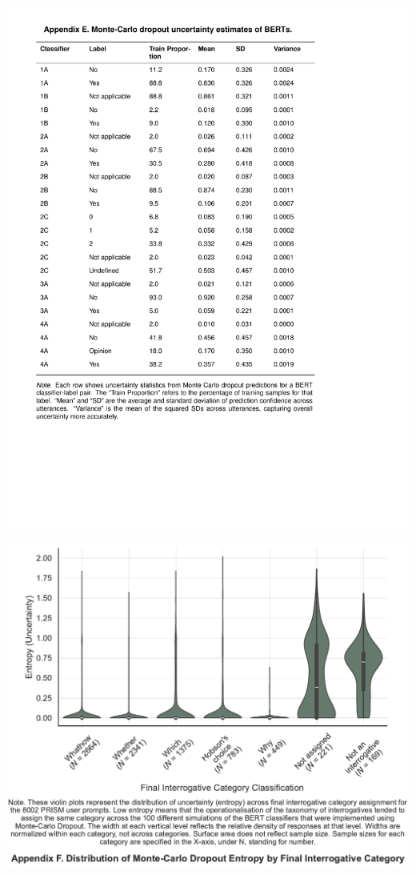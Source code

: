 \documentclass[
  12pt,
]{article}
\begin{document}
\begin{center}\includegraphics{../03_outputs/04_appendices/appendix_e} \end{center}

\begin{center}\includegraphics{../03_outputs/04_appendices/appendix_f} \end{center}
\end{document}
